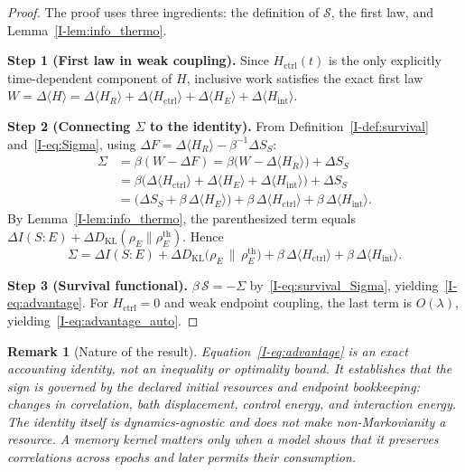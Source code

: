 \documentclass[12pt,a4paper,openany]{book}
\newtheorem{remark}[theorem]{Remark}
\begin{document}
\begin{proof}
The proof uses three ingredients: the definition of
$\mathcal{S}$, the first law, and
Lemma~\ref{I-lem:info_thermo}.

\noindent\textbf{Step 1 (First law in weak coupling).}
Since $H_{\mathrm{ctrl}}(t)$ is the only explicitly time-dependent
component of $H$, inclusive work satisfies the exact first law
$W = \Delta\langle H \rangle
= \Delta\langle H_R \rangle
  + \Delta\langle H_{\mathrm{ctrl}} \rangle
  + \Delta\langle H_E \rangle
  + \Delta\langle H_{\mathrm{int}} \rangle$.

\noindent\textbf{Step 2 (Connecting $\Sigma$ to the
identity).}
From Definition~\ref{I-def:survival} and~\eqref{I-eq:Sigma},
using $\Delta F = \Delta\langle H_R \rangle
- \beta^{-1}\Delta S_S$:
\begin{align}
\Sigma &= \beta(W - \Delta F)
= \beta\bigl(W - \Delta\langle H_R \rangle\bigr)
  + \Delta S_S \nonumber \\
&= \beta\bigl(\Delta\langle H_{\mathrm{ctrl}} \rangle
  + \Delta\langle H_E \rangle
  + \Delta\langle H_{\mathrm{int}} \rangle\bigr) + \Delta S_S
\nonumber \\
&= \bigl(\Delta S_S
  + \beta\,\Delta\langle H_E \rangle\bigr)
  + \beta\,\Delta\langle H_{\mathrm{ctrl}} \rangle
  + \beta\,\Delta\langle H_{\mathrm{int}} \rangle.
\label{I-eq:Sigma_decomp}
\end{align}
By Lemma~\ref{I-lem:info_thermo}, the parenthesized term
equals
$\Delta I(S{:}E)
+ \Delta D_{\mathrm{KL}}(\rho_E \| \rho_E^{\mathrm{th}})$.
Hence
\begin{equation}
\label{I-eq:Sigma_general}
\Sigma = \Delta I(S{:}E)
  + \Delta D_{\mathrm{KL}}\!\bigl(\rho_E \,\big\|\,
    \rho_E^{\mathrm{th}}\bigr)
  + \beta\,\Delta\langle H_{\mathrm{ctrl}} \rangle
  + \beta\,\Delta\langle H_{\mathrm{int}} \rangle.
\end{equation}

\noindent\textbf{Step 3 (Survival functional).}
$\beta\,\mathcal{S} = -\Sigma$ by~\eqref{I-eq:survival_Sigma},
yielding~\eqref{I-eq:advantage}.
For $H_{\mathrm{ctrl}} = 0$ and weak endpoint coupling, the last
term is $O(\lambda)$, yielding~\eqref{I-eq:advantage_auto}.
\end{proof}

\begin{remark}[Nature of the result]
\label{I-rem:identity_not_bound}
Equation~\eqref{I-eq:advantage} is an exact
\emph{accounting identity}, not an inequality or
optimality bound.
It establishes that the sign is governed by the declared initial
resources and endpoint bookkeeping: changes in correlation, bath
displacement, control energy, and interaction energy.  The identity
itself is dynamics-agnostic and does not make non-Markovianity a
resource.  A memory kernel matters only when a model shows that it
preserves correlations across epochs and later permits their
consumption.
\end{remark}
\end{document}
